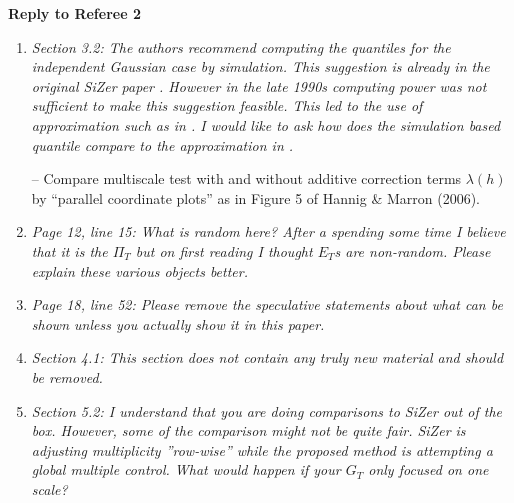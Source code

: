 \documentclass[a4paper,12pt]{article}
\begin{document}
\newpage
\begin{center}
{\large \bf Reply to Referee 2} 
\end{center}



\begin{enumerate}[label=(\arabic*),leftmargin=0.8cm]

\item \textit{Section 3.2: The authors recommend computing the quantiles for the independent Gaussian case by simulation. This suggestion is already in the original SiZer paper \citep{ChaudhuriMarron1999}. However in the late 1990s computing power was not sufficient to make this suggestion feasible. This led to the use of approximation such as in \cite{HannigMarron2006}. I would like to ask how does the simulation based quantile compare to the approximation in \cite{HannigMarron2006}.} 

-- Compare multiscale test with and without additive correction terms $\lambda(h)$ by ``parallel coordinate plots'' as in Figure 5 of Hannig \& Marron (2006). 


\item \textit{Page 12, line 15: What is random here? After a spending some time I believe that it is the $\Pi_T$ but on first reading I thought $E_T$s are non-random. Please explain these various objects better.}


\item \textit{Page 18, line 52: Please remove the speculative statements about what can be shown unless you actually show it in this paper.}


\item \textit{Section 4.1: This section does not contain any truly new material and should be removed.}


\item \textit{Section 5.2: I understand that you are doing comparisons to SiZer out of the box. However, some of the comparison might not be quite fair. SiZer is adjusting multiplicity ”row-wise” while the proposed method is attempting a global multiple control. What would happen if your $G_T$ only focused on one scale?}


\end{enumerate}
\end{document}
